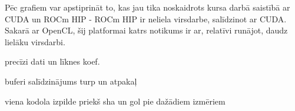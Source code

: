 Pēc grafiem var apstiprināt to, kas jau tika noskaidrots kursa darbā
saistībā ar CUDA un ROCm HIP - ROCm HIP ir neliela virsdarbe, salīdzinot
ar CUDA.\cite{kursa-darbs} Sakarā ar
OpenCL, šij platformai katrs notikums ir ar, relatīvi runājot, daudz lielāku
virsdarbi.

precīzi dati un līknes koef.


buferi salīdzinājums turp un atpakaļ


viena kodola izpilde priekš sha un gol pie dažādiem izmēriem



